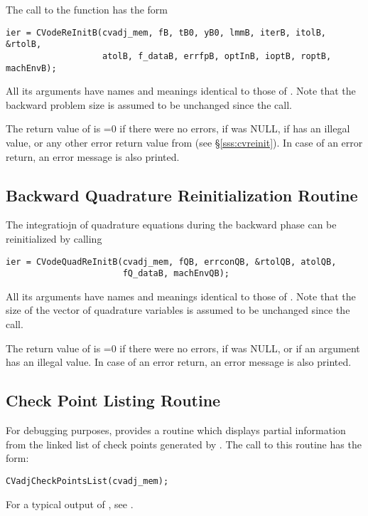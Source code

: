 The call to the  function has the form
\begin{verbatim}
ier = CVodeReInitB(cvadj_mem, fB, tB0, yB0, lmmB, iterB, itolB, &rtolB, 
                   atolB, f_dataB, errfpB, optInB, ioptB, roptB, machEnvB);
\end{verbatim}
All its arguments  have names and meanings identical to those of .
Note that the backward problem size  is assumed to be unchanged since 
the  call.

The return value  of  is  
=0 if there were no errors,
 if  was NULL,
 if  has an illegal value,
or any other error return value from  (see \S\ref{sss:cvreinit}).
In case of an error return, an error message is also printed.  

\subsection{Backward Quadrature Reinitialization Routine}\label{sss:cvodequadreinitb}

The integratiojn of quadrature equations during the backward phase can be
reinitialized by calling
\begin{verbatim}
ier = CVodeQuadReInitB(cvadj_mem, fQB, errconQB, &rtolQB, atolQB, 
                       fQ_dataB, machEnvQB);
\end{verbatim}
All its arguments  have names and meanings identical to those of .
Note that the size of the vector of quadrature variables is assumed to 
be unchanged since the  call.

The return value  of  is  
=0 if there were no errors,
 if  was NULL, or
 if an argument has an illegal value.
In case of an error return, an error message is also printed.  

\subsection{Check Point Listing Routine}

For debugging purposes, {\cvodes} provides a routine  which
displays partial information from the linked list of check points generated by
. The call to this routine has the form:
\begin{verbatim}
CVadjCheckPointsList(cvadj_mem);
\end{verbatim}
For a typical output of , see \cite{cvodes1.1_ex}.

